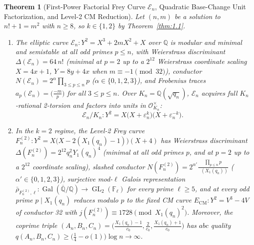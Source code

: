 \documentclass[11pt,reqno]{amsart}
\newtheorem{theorem}{Theorem}[section]
\theoremstyle{remark}
\numberwithin{equation}{section}
\newcommand{\Q}{\mathbb{Q}}
\newcommand{\F}{\mathbb{F}}
\DeclareMathOperator{\radodd}{rad_{\mathrm{odd}}}
\DeclareMathOperator{\Gal}{Gal}
\DeclareMathOperator{\GL}{GL}
\begin{document}
\begin{theorem}[{First-Power Factorial Frey Curve $\mathcal{E}_n$, Quadratic Base-Change Unit Factorization, and Level-2 CM Reduction}]\label{thm:8.1}
Let $(n, m)$ be a solution to $n! + 1 = m^2$ with $n \ge 8$, so $k \in \{1, 2\}$ by Theorem~\ref{thm:1.1}.
\begin{enumerate}
\item[(i)] The elliptic curve $\mathcal{E}_n : Y^2 = X^3 + 2mX^2 + X$ over $\Q$ is modular and minimal and semistable at all odd primes $p \le n$, with Weierstrass discriminant $\Delta(\mathcal{E}_n) = 64\,n!$ (minimal at $p = 2$ up to a $2^{12}$ Weierstrass coordinate scaling $X = 4x + 1$, $Y = 8y + 4x$ when $m \equiv -1 \pmod{32}$), conductor $N(\mathcal{E}_n) = 2^\alpha \prod_{3 \le p \le n} p$ ($\alpha \in \{0, 1, 2, 3\}$), and Frobenius traces $a_p(\mathcal{E}_n) = \bigl(\frac{-m}{p}\bigr)$ for all $3 \le p \le n$. Over $K_n = \Q(\sqrt{q_n})$, $\mathcal{E}_n$ acquires full $K_n$-rational 2-torsion and factors into units in $\mathcal{O}_{K_n}^\times$:
\begin{equation}\label{eq:8.1}
\mathcal{E}_n / K_n : Y^2 = X\bigl(X + \varepsilon_n^k\bigr)\bigl(X + \varepsilon_n^{-k}\bigr).
\end{equation}
\item[(ii)] In the $k = 2$ regime, the Level-2 Frey curve $F_n^{(2)} : Y^2 = X\bigl(X - 2(X_1(q_n) - 1)\bigr)(X + 4)$ has Weierstrass discriminant $\Delta(F_n^{(2)}) = 2^{12} q_n^2 Y_1(q_n)^4$ (minimal at all odd primes $p$, and at $p = 2$ up to a $2^{12}$ coordinate scaling), slashed conductor $N(F_n^{(2)}) = 2^{\alpha'} \frac{\prod_{p \le n} p}{\radodd(X_1(q_n))}$ ($\alpha' \in \{0, 1, 2, 3\}$), surjective mod-$\ell$ Galois representation $\bar{\rho}_{F_n^{(2)},\ell} : \Gal(\overline{\Q}/\Q) \to \GL_2(\F_\ell)$ for every prime $\ell \ge 5$, and at every odd prime $p \mid X_1(q_n)$ reduces modulo $p$ to the fixed CM curve $E_{\mathrm{CM}} : Y^2 = V^3 - 4V$ of conductor 32 with $j(F_n^{(2)}) \equiv 1728 \pmod{X_1(q_n)^2}$. Moreover, the coprime triple $(A_n, B_n, C_n) = \bigl(\frac{X_1(q_n)-1}{c_0}, \frac{2}{c_0}, \frac{X_1(q_n)+1}{c_0}\bigr)$ has $abc$ quality $q(A_n, B_n, C_n) \ge \bigl(\frac{1}{4} - o(1)\bigr)\log n \to \infty$.
\end{enumerate}
\end{theorem}
\end{document}
